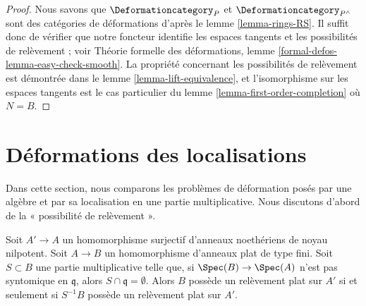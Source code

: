 \begin{proof}
Nous savons que $\Deformationcategory_P$ et $\Deformationcategory_{P^\wedge}$
sont des catégories de déformations d'après le lemme \ref{lemma-rings-RS}.
Il suffit donc de vérifier que
notre foncteur identifie les espaces tangents et les possibilités
de relèvement ; voir Théorie formelle des déformations, lemme
\ref{formal-defos-lemma-easy-check-smooth}.
La propriété concernant les possibilités de relèvement est démontrée dans le
lemme \ref{lemma-lift-equivalence},
et l'isomorphisme sur les espaces tangents est le cas particulier du
lemme \ref{lemma-first-order-completion} où $N = B$.
\end{proof}



\section{Déformations des localisations}
\label{section-compare-localization}

\noindent
Dans cette section, nous comparons les problèmes de déformation posés
par une algèbre et par sa localisation en une partie multiplicative.
Nous discutons d'abord de la « possibilité de relèvement ».

\begin{lemma}
\label{lemma-lift-equivalence-localization}
Soit $A' \to A$ un homomorphisme surjectif d'anneaux noethériens de noyau nilpotent.
Soit $A \to B$ un homomorphisme d'anneaux plat de type fini.
Soit $S \subset B$ une partie multiplicative telle que,
si $\Spec(B) \to \Spec(A)$ n'est pas syntomique en $\mathfrak q$,
alors $S \cap \mathfrak q = \emptyset$.
Alors $B$ possède un relèvement plat sur $A'$ si et seulement si
$S^{-1}B$ possède un relèvement plat sur $A'$.
\end{lemma}

